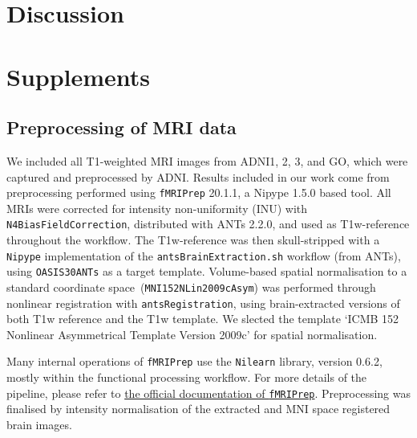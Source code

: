 \documentclass{article}
\begin{document}
\section{Discussion}\label{sec:discussion}

\clearpage



\appendix

\section{Supplements}
\subsection{Preprocessing of MRI data}
\label{apd:preprocessing}
We included all T1-weighted MRI images from ADNI1, 2, 3, and GO, which were captured and preprocessed by ADNI.
Results included in our work come from preprocessing performed using \texttt{fMRIPrep} 20.1.1, a Nipype 1.5.0 based tool.
All MRIs were corrected for intensity non-uniformity (INU) with \texttt{N4BiasFieldCorrection}, distributed with ANTs 2.2.0, and used as T1w-reference throughout the workflow.
The T1w-reference was then skull-stripped with a \texttt{Nipype} implementation of
the \texttt{antsBrainExtraction.sh} workflow (from ANTs), using \texttt{OASIS30ANTs} as a target template.
Volume-based spatial normalisation to a standard coordinate space~(\texttt{MNI152NLin2009cAsym}) was performed through
nonlinear registration with \texttt{antsRegistration}, using brain-extracted versions of both T1w reference and the T1w template.
We slected the template `ICMB 152 Nonlinear Asymmetrical Template Version 2009c' for spatial normalisation.

Many internal operations of \texttt{fMRIPrep} use the
\texttt{Nilearn} library, version 0.6.2, %
mostly within the functional processing workflow.
For more details of the pipeline, please refer to \href{https://fMRIPrep.readthedocs.io/en/latest/workflows.html}{the official documentation of \texttt{fMRIPrep}}. Preprocessing was finalised by intensity normalisation of the extracted and MNI space registered brain images. %
\end{document}
